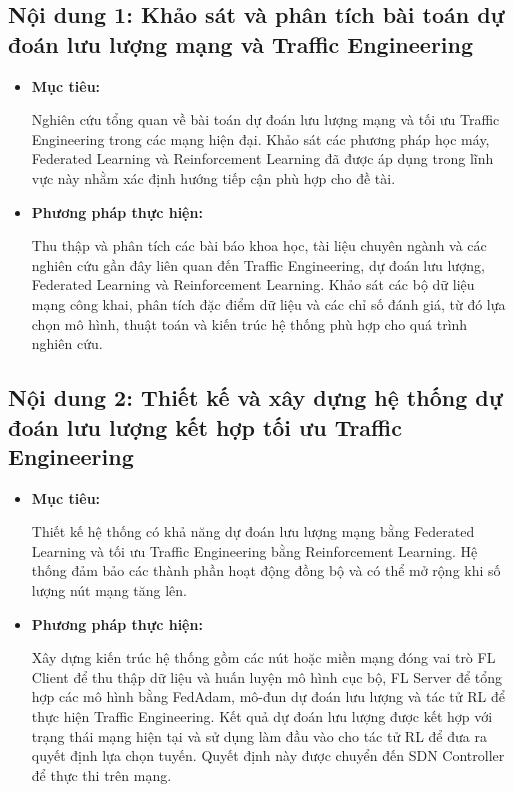 
\subsection{Nội dung 1: Khảo sát và phân tích bài toán dự đoán lưu lượng mạng và Traffic Engineering}

\begin{itemize}
    \item \textbf{Mục tiêu:}

    Nghiên cứu tổng quan về bài toán dự đoán lưu lượng mạng và tối ưu Traffic Engineering trong các mạng hiện đại. Khảo sát các phương pháp học máy, Federated Learning và Reinforcement Learning đã được áp dụng trong lĩnh vực này nhằm xác định hướng tiếp cận phù hợp cho đề tài.

    \item \textbf{Phương pháp thực hiện:}

    Thu thập và phân tích các bài báo khoa học, tài liệu chuyên ngành và các nghiên cứu gần đây liên quan đến Traffic Engineering, dự đoán lưu lượng, Federated Learning và Reinforcement Learning. Khảo sát các bộ dữ liệu mạng công khai, phân tích đặc điểm dữ liệu và các chỉ số đánh giá, từ đó lựa chọn mô hình, thuật toán và kiến trúc hệ thống phù hợp cho quá trình nghiên cứu.
\end{itemize}

\subsection{Nội dung 2: Thiết kế và xây dựng hệ thống dự đoán lưu lượng kết hợp tối ưu Traffic Engineering}

\begin{itemize}
    \item \textbf{Mục tiêu:}

    Thiết kế hệ thống có khả năng dự đoán lưu lượng mạng bằng Federated Learning và tối ưu Traffic Engineering bằng Reinforcement Learning. Hệ thống đảm bảo các thành phần hoạt động đồng bộ và có thể mở rộng khi số lượng nút mạng tăng lên.

    \item \textbf{Phương pháp thực hiện:}

    Xây dựng kiến trúc hệ thống gồm các nút hoặc miền mạng đóng vai trò FL Client để thu thập dữ liệu và huấn luyện mô hình cục bộ, FL Server để tổng hợp các mô hình bằng FedAdam, mô-đun dự đoán lưu lượng và tác tử RL để thực hiện Traffic Engineering. Kết quả dự đoán lưu lượng được kết hợp với trạng thái mạng hiện tại và sử dụng làm đầu vào cho tác tử RL để đưa ra quyết định lựa chọn tuyến. Quyết định này được chuyển đến SDN Controller để thực thi trên mạng.
\end{itemize}


